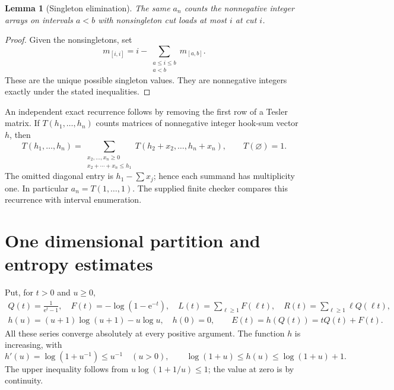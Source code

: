 \documentclass[11pt,a4paper]{article}
\newtheorem{lemma}[theorem]{Lemma}
\theoremstyle{remark}\newtheorem{remark}[theorem]{Remark}
\newcommand{\ee}{\mathrm e}\newcommand{\dd}{\,\mathrm d}
\numberwithin{equation}{section}
\begin{document}
\begin{lemma}[Singleton elimination]\label{tes:lem:singletons}
The same $a_n$ counts the nonnegative integer arrays on intervals $a<b$ with nonsingleton cut loads at most $i$ at cut $i$.
\end{lemma}
\begin{proof}
Given the nonsingletons, set
\[
m_{[i,i]}=i-\sum_{\substack{a\le i\le b\\a<b}}m_{[a,b]}.
\]
These are the unique possible singleton values. They are nonnegative integers exactly under the stated inequalities.
\end{proof}

An independent exact recurrence follows by removing the first row of a Tesler matrix. If $T(h_1,\ldots,h_n)$ counts matrices of nonnegative integer hook-sum vector $h$, then
\begin{equation}\label{tes:eq:hookrec}
T(h_1,\ldots,h_n)=
\sum_{\substack{x_2,\ldots,x_n\ge0\\x_2+\cdots+x_n\le h_1}}
T(h_2+x_2,\ldots,h_n+x_n),\qquad T(\varnothing)=1.
\end{equation}
The omitted diagonal entry is $h_1-\sum x_j$; hence each summand has multiplicity one. In particular $a_n=T(1,\ldots,1)$. The supplied finite checker compares this recurrence with interval enumeration.

\section{One dimensional partition and entropy estimates}\label{tes:sec:analytic}
Put, for $t>0$ and $u\ge0$,
\begin{gather}
Q(t)=\frac1{\ee^t-1},\quad F(t)=-\log(1-\ee^{-t}),\quad
L(t)=\sum_{\ell\ge1}F(\ell t),\quad R(t)=\sum_{\ell\ge1}\ell Q(\ell t),\label{tes:eq:functions}\\
h(u)=(u+1)\log(u+1)-u\log u,\quad h(0)=0,\qquad
E(t)=h(Q(t))=tQ(t)+F(t).\label{tes:eq:entropyfunctions}
\end{gather}
All these series converge absolutely at every positive argument. The function $h$ is increasing, with
\begin{equation}\label{tes:eq:hfacts}
h'(u)=\log(1+u^{-1})\le u^{-1}\quad(u>0),\qquad
\log(1+u)\le h(u)\le\log(1+u)+1.
\end{equation}
The upper inequality follows from $u\log(1+1/u)\le1$; the value at zero is by continuity.
\end{document}
